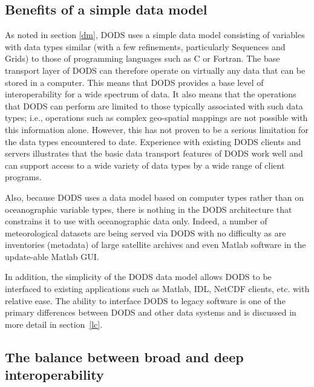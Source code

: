 \documentclass{article}
\begin{document}
\subsection{Benefits of a simple data model}
\label{ddm}

As noted in section \ref{dm}, \ac{DODS} uses a simple data model consisting
of variables with data types similar (with a few refinements, particularly
Sequences and Grids) to those of programming languages such as C or Fortran.
The base transport layer of \ac{DODS} can therefore operate on virtually any
data that can be stored in a computer. This means that \ac{DODS} provides a
base level of interoperability for a wide spectrum of data. It also means
that the operations that \ac{DODS} can perform are limited to those typically
associated with such data types; i.e., operations such as complex geo-spatial
mappings are not possible with this information alone. However, this has not
proven to be a serious limitation for the data types encountered to date.
Experience with existing \ac{DODS} clients and servers illustrates that the
basic data transport features of \ac{DODS} work well and can support access
to a wide variety of data types by a wide range of client programs.

Also, because \ac{DODS} uses a data model based on computer types rather than
on oceanographic variable types, there is nothing in the \ac{DODS}
architecture that constrains it to use with oceanographic data only.  Indeed,
a number of meteorological datasets are being served via \ac{DODS} with no
difficulty as are inventories (metadata) of large satellite archives and even
Matlab software in the update-able Matlab GUI.

In addition, the simplicity of the \ac{DODS} data model allows \ac{DODS} to
be interfaced to existing applications such as Matlab, IDL, \acs{NetCDF}
clients, etc. with relative ease. The ability to interface \ac{DODS} to
legacy software is one of the primary differences between \ac{DODS} and other
data systems and is discussed in more detail in section~\ref{lc}.

\subsection{The balance between broad and deep interoperability}
\label{dmd}
\end{document}
